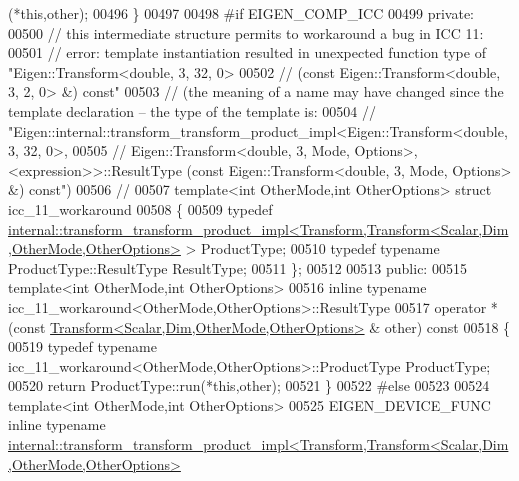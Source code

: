 \begin{DoxyCode}
      (*\textcolor{keyword}{this},other);
00496   \}
00497   
00498 \textcolor{preprocessor}{  #if EIGEN\_COMP\_ICC}
00499 \textcolor{keyword}{private}:
00500   \textcolor{comment}{// this intermediate structure permits to workaround a bug in ICC 11:}
00501   \textcolor{comment}{//   error: template instantiation resulted in unexpected function type of "Eigen::Transform<double, 3,
       32, 0>}
00502   \textcolor{comment}{//             (const Eigen::Transform<double, 3, 2, 0> &) const"}
00503   \textcolor{comment}{//  (the meaning of a name may have changed since the template declaration -- the type of the template
       is:}
00504   \textcolor{comment}{// "Eigen::internal::transform\_transform\_product\_impl<Eigen::Transform<double, 3, 32, 0>,}
00505   \textcolor{comment}{//     Eigen::Transform<double, 3, Mode, Options>, <expression>>::ResultType (const
       Eigen::Transform<double, 3, Mode, Options> &) const")}
00506   \textcolor{comment}{// }
00507   \textcolor{keyword}{template}<\textcolor{keywordtype}{int} OtherMode,\textcolor{keywordtype}{int} OtherOptions> \textcolor{keyword}{struct }icc\_11\_workaround
00508   \{
00509     \textcolor{keyword}{typedef} 
      \hyperlink{struct_eigen_1_1internal_1_1transform__transform__product__impl}{internal::transform\_transform\_product\_impl<Transform,Transform<Scalar,Dim,OtherMode,OtherOptions>}
       > ProductType;
00510     \textcolor{keyword}{typedef} \textcolor{keyword}{typename} ProductType::ResultType ResultType;
00511   \};
00512   
00513 \textcolor{keyword}{public}:
00515   \textcolor{keyword}{template}<\textcolor{keywordtype}{int} OtherMode,\textcolor{keywordtype}{int} OtherOptions>
00516   \textcolor{keyword}{inline} \textcolor{keyword}{typename} icc\_11\_workaround<OtherMode,OtherOptions>::ResultType
00517     operator * (\textcolor{keyword}{const} \hyperlink{group___geometry___module_class_eigen_1_1_transform}{Transform<Scalar,Dim,OtherMode,OtherOptions>}
      & other)\textcolor{keyword}{ const}
00518 \textcolor{keyword}{  }\{
00519     \textcolor{keyword}{typedef} \textcolor{keyword}{typename} icc\_11\_workaround<OtherMode,OtherOptions>::ProductType ProductType;
00520     \textcolor{keywordflow}{return} ProductType::run(*\textcolor{keyword}{this},other);
00521   \}
00522 \textcolor{preprocessor}{  #else}
00523 
00524   \textcolor{keyword}{template}<\textcolor{keywordtype}{int} OtherMode,\textcolor{keywordtype}{int} OtherOptions>
00525   EIGEN\_DEVICE\_FUNC \textcolor{keyword}{inline} \textcolor{keyword}{typename} 
      \hyperlink{struct_eigen_1_1internal_1_1transform__transform__product__impl}{internal::transform\_transform\_product\_impl<Transform,Transform<Scalar,Dim,OtherMode,OtherOptions>}

\end{DoxyCode}
